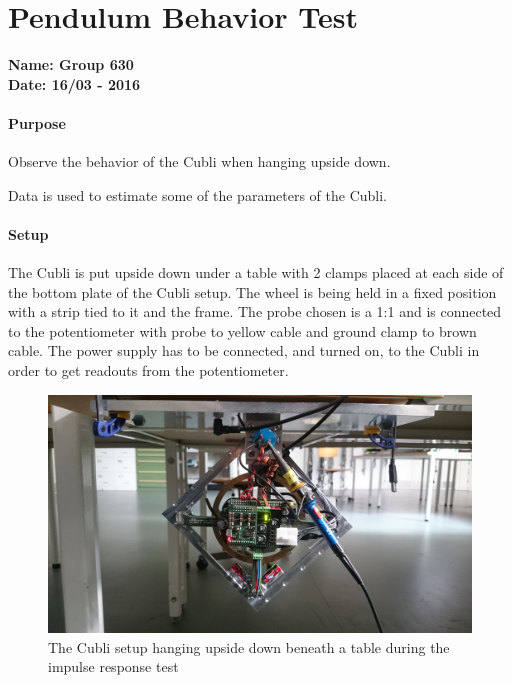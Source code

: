 \chapter{Pendulum Behavior Test}\label{impulseResponseAppendix} 

\textbf{Name: Group 630}\\
\textbf{Date: 16/03 - 2016}

\subsubsection{Purpose}
Observe the behavior of the Cubli when hanging upside down.

Data is used to estimate some of the parameters of the Cubli.

\subsubsection{Setup}
The Cubli is put upside down under a table with 2 clamps placed at each side of the bottom plate of the Cubli setup.
The wheel is being held in a fixed position with a strip tied to it and the frame. The probe chosen is a 1:1 and is connected to the potentiometer with probe to yellow cable and ground clamp to brown cable. The power supply has to be connected, and turned on, to the Cubli in order to get readouts from the potentiometer.
\begin{figure}[H] 
	\centering 
	\includegraphics[scale=0.065]{figures/impulseResponseSetup}
	\caption{The Cubli setup hanging upside down beneath a table during the impulse response test}
	\label{impulseResponseTestPicture}
\end{figure} 

